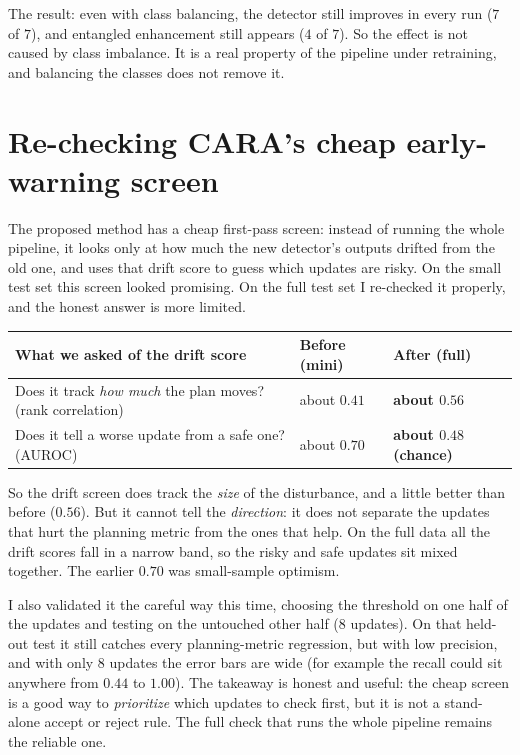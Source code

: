 \documentclass[11pt,a4paper]{article}
\begin{document}
\noindent
The result: even with class balancing, the detector still improves in every run
($7$ of $7$), and entangled enhancement still appears ($4$ of $7$). So the effect
is not caused by class imbalance. It is a real property of the pipeline under
retraining, and balancing the classes does not remove it.

\section{Re-checking CARA's cheap early-warning screen}

The proposed method has a cheap first-pass screen: instead of running the whole
pipeline, it looks only at how much the new detector's outputs drifted from the old
one, and uses that drift score to guess which updates are risky. On the small test
set this screen looked promising. On the full test set I re-checked it properly,
and the honest answer is more limited.

\begin{table}[h!]
\centering
\renewcommand{\arraystretch}{1.3}
\begin{tabular}{@{}L{7.2cm}C{3.0cm}C{3.0cm}@{}}
\toprule
\textbf{What we asked of the drift score} & \textbf{Before (mini)} & \textbf{After (full)} \\
\midrule
Does it track \emph{how much} the plan moves? (rank correlation) & about $0.41$ & \textbf{about $0.56$} \\
Does it tell a worse update from a safe one? (AUROC) & about $0.70$ & \textbf{about $0.48$ (chance)} \\
\bottomrule
\end{tabular}
\end{table}

\noindent
So the drift screen does track the \emph{size} of the disturbance, and a little
better than before ($0.56$). But it cannot tell the \emph{direction}: it does not
separate the updates that hurt the planning metric from the ones that help. On the
full data all the drift scores fall in a narrow band, so the risky and safe updates
sit mixed together. The earlier $0.70$ was small-sample optimism.

I also validated it the careful way this time, choosing the threshold on one half of
the updates and testing on the untouched other half ($8$ updates). On that held-out
test it still catches every planning-metric regression, but with low precision, and
with only $8$ updates the error bars are wide (for example the recall could sit
anywhere from $0.44$ to $1.00$). The takeaway is honest and useful: the cheap screen
is a good way to \emph{prioritize} which updates to check first, but it is not a
stand-alone accept or reject rule. The full check that runs the whole pipeline
remains the reliable one.
\end{document}

